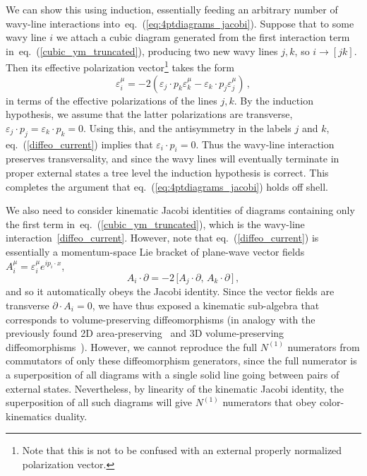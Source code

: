 \documentclass[11pt,a4paper]{article}
\def\eqn#1{eq.~(\ref{#1})}
\begin{document}
We can show this using induction, essentially feeding an arbitrary number of wavy-line interactions into~\eqn{eq:4ptdiagrams_jacobi}. Suppose that to some wavy line $i$ we attach a cubic diagram generated from the first interaction term in~\eqn{cubic_ym_truncated}, producing two new wavy lines $j,k$, so $i\to[jk]$. Then its effective polarization vector\footnote{Note that this is not to be confused with an external properly normalized polarization vector.} takes the form
\begin{equation}\label{diffeo_current}
    \varepsilon_{i}^\mu = -2 ( \varepsilon_j{\cdot}p_k \varepsilon_k^\mu - \varepsilon_k{\cdot}p_j \varepsilon_j^\mu ) \, ,
\end{equation}
in terms of the effective polarizations of the lines $j,k$. 
 By the induction hypothesis, we assume that the latter polarizations are transverse, $\varepsilon_j{\cdot}p_j = \varepsilon_k{\cdot}p_k=0$. Using this, and the antisymmetry in the labels $j$ and $k$, \eqn{diffeo_current} implies that $\varepsilon_i{\cdot}p_i = 0$. Thus the wavy-line interaction preserves transversality, and since the wavy lines will eventually terminate in proper external states  a tree level the induction hypothesis is correct.  This completes the argument that \eqn{eq:4ptdiagrams_jacobi} holds off shell. 

We also need to consider kinematic Jacobi identities of diagrams containing only the first term in~\eqn{cubic_ym_truncated}, which is the wavy-line interaction~\eqref{diffeo_current}. However, note that \eqn{diffeo_current} is essentially a momentum-space Lie bracket of plane-wave vector fields $A_i^\mu=\varepsilon_i^\mu e^{i p_i \cdot x}$,
\begin{equation}
A_i \cdot \partial = -2\, \big[A_j \cdot \partial, \, A_k \cdot \partial \, \big]\,,
\end{equation}
and so it automatically obeys the Jacobi identity. Since the vector fields are transverse $\partial \cdot A_i=0$, we have thus exposed a kinematic sub-algebra that corresponds to volume-preserving diffeomorphisms (in analogy with the previously found 2D area-preserving~\cite{Monteiro:2011pc} and 3D volume-preserving diffeomorphisms~\cite{Ben-Shahar:2021zww}). However, we cannot reproduce the full $N^{(1)}$ numerators from commutators of only these diffeomorphism generators, since the full numerator is a superposition of all diagrams with a single solid line going between pairs of external states. Nevertheless, by linearity of the kinematic Jacobi identity, the superposition of all such diagrams will give $N^{(1)}$ numerators that obey color-kinematics duality.  
\end{document}
